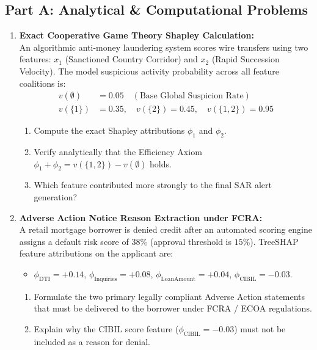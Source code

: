 \subsection*{Part A: Analytical \& Computational Problems}

\begin{enumerate}[label=\textbf{P12.\arabic*}]
    \item \textbf{Exact Cooperative Game Theory Shapley Calculation:}\\
    An algorithmic anti-money laundering system scores wire transfers using two features: $x_1$ (Sanctioned Country Corridor) and $x_2$ (Rapid Succession Velocity). The model suspicious activity probability across all feature coalitions is:
    \begin{align*}
    v(\emptyset) &= 0.05 \quad (\text{Base Global Suspicion Rate}) \\
    v(\{1\}) &= 0.35, \quad v(\{2\}) = 0.45, \quad v(\{1, 2\}) = 0.95
    \end{align*}
    \begin{enumerate}[label=(\alph*)]
        \item Compute the exact Shapley attributions $\phi_1$ and $\phi_2$.
        \item Verify analytically that the Efficiency Axiom $\phi_1 + \phi_2 = v(\{1, 2\}) - v(\emptyset)$ holds.
        \item Which feature contributed more strongly to the final SAR alert generation?
    \end{enumerate}

    \item \textbf{Adverse Action Notice Reason Extraction under FCRA:}\\
    A retail mortgage borrower is denied credit after an automated scoring engine assigns a default risk score of $38\%$ (approval threshold is $15\%$). TreeSHAP feature attributions on the applicant are:
    \begin{itemize}
        \item $\phi_{\text{DTI}} = +0.14$, $\phi_{\text{Inquiries}} = +0.08$, $\phi_{\text{LoanAmount}} = +0.04$, $\phi_{\text{CIBIL}} = -0.03$.
    \end{itemize}
    \begin{enumerate}[label=(\alph*)]
        \item Formulate the two primary legally compliant Adverse Action statements that must be delivered to the borrower under FCRA / ECOA regulations.
        \item Explain why the CIBIL score feature ($\phi_{\text{CIBIL}} = -0.03$) must not be included as a reason for denial.
    \end{enumerate}


\end{enumerate}
